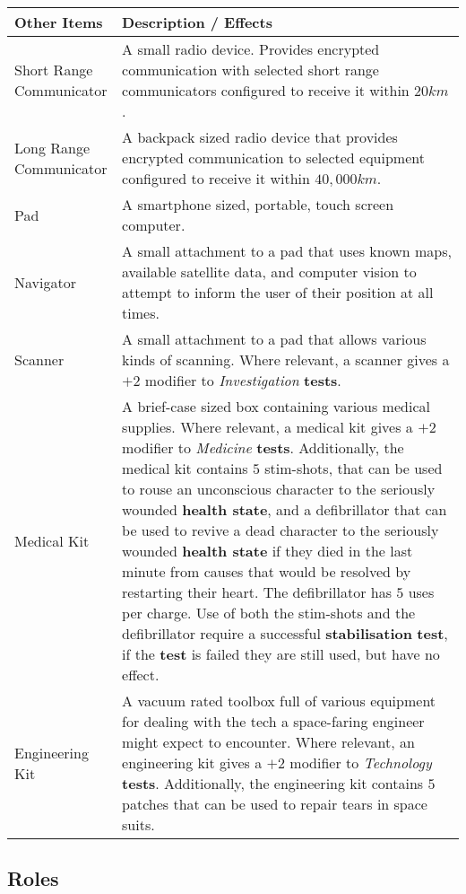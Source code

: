 \documentclass[11pt]{article}
\begin{document}
\begin{multicols}{3}
  \begin{tabularx}{\linewidth}{lX}
    Other Items & Description / Effects \\
    \hline
    \makecell[t]{Short Range\\Communicator} & A small radio device. Provides encrypted communication with selected short range communicators configured to receive it within $20km$. \\
    \makecell[t]{Long Range\\Communicator} & A backpack sized radio device that provides encrypted communication to selected equipment configured to receive it within $40,000km$. \\
    Pad & A smartphone sized, portable, touch screen computer. \\
    Navigator & A small attachment to a pad that uses known maps, available satellite data, and computer vision to attempt to inform the user of their position at all times. \\
    Scanner & A small attachment to a pad that allows various kinds of scanning. Where relevant, a scanner gives a $+2$ modifier to \textit{Investigation} \textbf{tests}. \\
    Medical Kit & A brief-case sized box containing various medical supplies. Where relevant, a medical kit gives a $+2$ modifier to \textit{Medicine} \textbf{tests}. Additionally, the medical kit contains $5$ stim-shots, that can be used to rouse an unconscious character to the seriously wounded \textbf{health state}, and a defibrillator that can be used to revive a dead character to the seriously wounded \textbf{health state} if they died in the last minute from causes that would be resolved by restarting their heart. The defibrillator has $5$ uses per charge. Use of both the stim-shots and the defibrillator require a successful \textbf{stabilisation} \textbf{test}, if the \textbf{test} is failed they are still used, but have no effect. \\
    Engineering Kit & A vacuum rated toolbox full of various equipment for dealing with the tech a space-faring engineer might expect to encounter. Where relevant, an engineering kit gives a $+2$ modifier to \textit{Technology} \textbf{tests}. Additionally, the engineering kit contains $5$ patches that can be used to repair tears in space suits.
  \end{tabularx}

  \vfill\null
  \columnbreak

  \subsection*{Roles}


\end{multicols}
\end{document}
